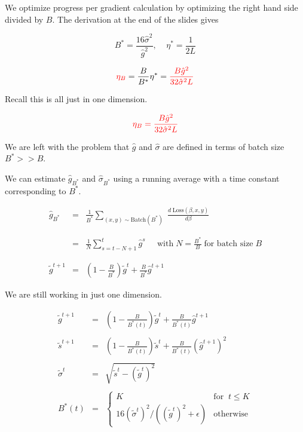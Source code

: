 {\vfill
We optimize progress per gradient calculation by optimizing the right hand side divided by $B$.  The derivation at the end of the slides gives

\vfill
$$B^*  =  \frac{16\hat{\sigma}^2}{\hat{g}^2},\;\;\;\;\eta^*  =  \frac{1}{2L}$$

\vfill
$${\color{red} \eta_B} = \frac{B}{B^*} \eta^* = {\color{red} \frac{B \hat{g}^2}{32\hat{\sigma}^2L}}$$

\vfill
Recall this is all just in one dimension.


$${\color{red} \eta_B = \frac{B \hat{g}^2}{32\hat{\sigma}^2L}}$$

\vfill
We are left with the problem that $\hat{g}$ and $\hat{\sigma}$ are defined in terms of batch size $B^* >> B$.

\vfill
We can estimate $\hat{g}_{B^*}$ and $\hat{\sigma}_{B^*}$ using a running average with a time constant corresponding to $B^*$.


\begin{eqnarray*}
  \hat{g}_{B^*} & = & \frac{1}{B^*} \sum_{(x,y) \sim \mathrm{Batch}(B^*)}\; \frac{d\;\mathrm{Loss}(\beta,x,y)}{d\beta} \\
  \\
  \\
  & = & \frac{1}{N} \sum_{s=t-N+1}^t \hat{g}^s\;\;\;\;\;\mbox{with}\;N= \frac{B^*}{B} \;\mbox{for batch size}\;B \\
  \\
  \\
  \tilde{g}^{t+1} & = & \left(1-\frac{B}{B^*}\right)\tilde{g}^t + \frac{B}{B^*} \hat{g}^{t+1}
\end{eqnarray*}

\vfill
We are still working in just one dimension.

\begin{eqnarray*}
  \tilde{g}^{t+1} & = & \left(1-\frac{B}{B^*(t)}\right)\tilde{g}^t + \frac{B}{B^*(t)} \hat{g}^{t+1} \\
  \\
  \tilde{s}^{t+1} & = & \left(1-\frac{B}{B^*(t)}\right)\tilde{s}^t + \frac{B}{B^*(t)} (\hat{g}^{t+1})^2 \\
  \\
  \tilde{\sigma}^t & = & \sqrt{\tilde{s}^t - (\tilde{g}^t)^2} \\
  \\
  B^*(t) &= & \left\{\begin{array}{ll} K & \mbox{for}\;\; t \leq K \\
  16(\tilde{\sigma}^t)^2/((\tilde{g}^t)^2 + \epsilon) & \mbox{otherwise} \end{array}\right.
\end{eqnarray*}

}
